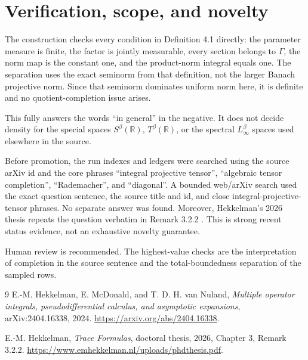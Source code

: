 \documentclass[11pt]{article}
\newcommand{\R}{\mathbb R}
\newcommand{\G}{\Gamma}
\begin{document}
\section{Verification, scope, and novelty}

The construction checks every condition in Definition 4.1 directly: the
parameter measure is finite, the factor is jointly measurable, every section
belongs to $\G$, the norm map is the constant one, and the product-norm
integral equals one.  The separation uses the exact seminorm from that
definition, not the larger Banach projective norm.  Since that seminorm
dominates uniform norm here, it is definite and no quotient-completion issue
arises.

This fully answers the words ``in general'' in the negative.  It does not
decide density for the special spaces $S^\beta(\R)$, $T^\beta(\R)$, or the
spectral $L_\infty^\beta$ spaces used elsewhere in the source.

Before promotion, the run indexes and ledgers were searched using the source
arXiv id and the core phrases ``integral projective tensor'', ``algebraic
tensor completion'', ``Rademacher'', and ``diagonal''.  A bounded web/arXiv
search used the exact question sentence, the source title and id, and close
integral-projective-tensor phrases.  No separate answer was found.  Moreover,
Hekkelman's 2026 thesis repeats the question verbatim in Remark 3.2.2
\cite{HekkelmanThesis}.  This is strong recent status evidence, not an
exhaustive novelty guarantee.

Human review is recommended.  The highest-value checks are the interpretation
of completion in the source sentence and the total-boundedness separation of
the sampled rows.

\begin{thebibliography}{9}
E.-M. Hekkelman, E. McDonald, and T. D. H. van Nuland,
\emph{Multiple operator integrals, pseudodifferential calculus, and asymptotic
expansions}, arXiv:2404.16338, 2024.
\url{https://arxiv.org/abs/2404.16338}.

E.-M. Hekkelman,
\emph{Trace Formulas}, doctoral thesis, 2026, Chapter 3, Remark 3.2.2.
\url{https://www.emhekkelman.nl/uploads/phdthesis.pdf}.
\end{thebibliography}
\end{document}
